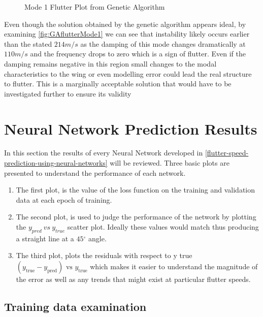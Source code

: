 \begin{figure}[H]
    \centering
    
    \caption{Mode 1 Flutter Plot from Genetic Algorithm}
    \label{fig:GAflutterMode1}
\end{figure}

Even though the solution obtained by the genetic algorithm appears ideal,
by examining \autoref{fig:GAflutterMode1} we can see that instability likely occurs earlier than the stated $214 m/s$ as the damping of this mode changes dramatically at $110 m/s$ and the frequency drops to zero which is a sign of flutter. Even if the damping remains negative in this region small changes to the modal characteristics to the wing or even modelling error could lead the real structure to flutter. This is a marginally acceptable solution that would have to be investigated further to ensure its validity

\section{Neural Network Prediction Results}
\label{neural-network-prediction-results}

In this section the results of every Neural Network developed in \autoref{flutter-speed-prediction-using-neural-networks} will be reviewed. Three basic plots are presented to understand
the performance of each network.

\begin{enumerate}
\def\labelenumi{\arabic{enumi}.}
\item
  The first plot, is the value of the loss function on the training and
  validation data at each epoch of training.
\item
  The second plot, is used to judge the performance of the network by
  plotting the \(y_{pred}\ vs\ y_{true}\) scatter plot. Ideally these
  values would match thus producing a straight line at a \(45{^\circ}\)
  angle.
\item
  The third plot, plots the residuals with respect to y true
  \( (y_{\text{true}} - y_{\text{pred}}) \text{ vs } y_{\text{true}} \) which makes it easier to
  understand the magnitude of the error as well as any trends that might
  exist at particular flutter speeds.
\end{enumerate}

\subsection{Training data examination}
\label{training-data-examination}

